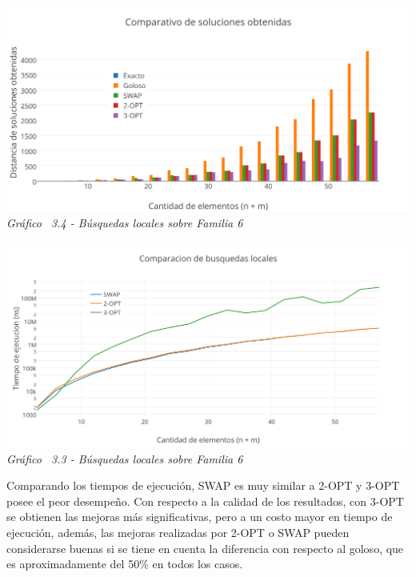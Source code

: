 \vspace*{0.3cm} \vspace*{0.3cm}
  \begin{center}
 \includegraphics[scale=0.5]{./EJ3/comparacionbusquedaslocalessolucionsinorden.png}\\
 {            \textit{Gráfico \ 3.4 - Búsquedas locales sobre Familia 6}}
  \end{center}
  \vspace*{0.3cm}


\vspace*{0.3cm} \vspace*{0.3cm}
  \begin{center}
 \includegraphics[scale=0.5]{./EJ3/comparacionbusquedaslocalessinorden.png}\\
 {            \textit{Gráfico \ 3.3 - Búsquedas locales sobre Familia 6}}
  \end{center}
  \vspace*{0.3cm}

Comparando los tiempos de ejecución, SWAP es muy similar a 2-OPT y 3-OPT  posee el peor desempeño. Con respecto a la calidad de los resultados, con 3-OPT se obtienen las mejoras más significativas, pero a un costo mayor en tiempo de ejecución, además, las mejoras realizadas por 2-OPT o SWAP pueden considerarse buenas si se tiene en cuenta la diferencia con respecto al goloso, que es aproximadamente del 50$\%$ en todos los casos.

